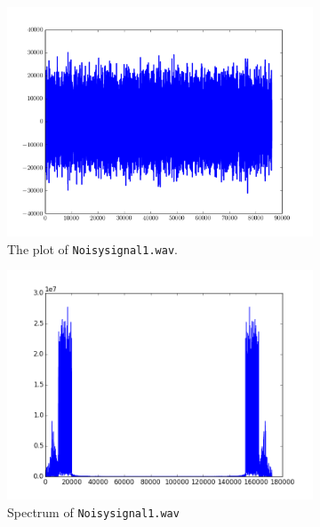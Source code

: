 \begin{figure}
\captionsetup[subfigure]{justification=centering}
\centering
\begin{subfigure}{.5\textwidth}
    \centering
    \includegraphics[width=\linewidth]{figures/noisy.png}
    \caption{The plot of \texttt{Noisysignal1.wav}.}
    \label{fig:noisysignal}
\end{subfigure}%
\begin{subfigure}{.5\textwidth}
    \centering
    \includegraphics[width=\linewidth]{figures/noisyspec.png}
    \caption{Spectrum of \texttt{Noisysignal1.wav}}
    \label{fig:noisyspec}
\end{subfigure}
\caption{}
\end{figure}

